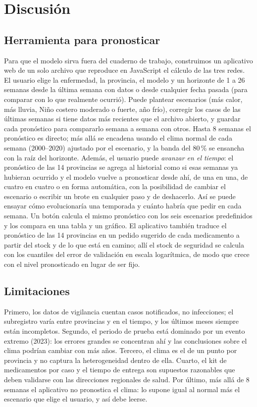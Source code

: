 \documentclass[conference,a4paper]{IEEEtran}
\begin{document}


\section{Discusión}
\subsection{Herramienta para pronosticar}
Para que el modelo sirva fuera del cuaderno de trabajo, construimos un aplicativo web de un solo archivo que reproduce en JavaScript el cálculo de las tres redes. El usuario elige la enfermedad, la provincia, el modelo y un horizonte de 1 a 26 semanas desde la última semana con datos o desde cualquier fecha pasada (para comparar con lo que realmente ocurrió). Puede plantear escenarios (más calor, más lluvia, Niño costero moderado o fuerte, año frío), corregir los casos de las últimas semanas si tiene datos más recientes que el archivo abierto, y guardar cada pronóstico para compararlo semana a semana con otros. Hasta 8 semanas el pronóstico es directo; más allá se encadena usando el clima normal de cada semana (2000--2020) ajustado por el escenario, y la banda del 80\,\% se ensancha con la raíz del horizonte. Además, el usuario puede \emph{avanzar en el tiempo}: el pronóstico de las 14 provincias se agrega al historial como si esas semanas ya hubieran ocurrido y el modelo vuelve a pronosticar desde ahí, de una en una, de cuatro en cuatro o en forma automática, con la posibilidad de cambiar el escenario o escribir un brote en cualquier paso y de deshacerlo. Así se puede ensayar cómo evolucionaría una temporada y cuánto habría que pedir en cada semana. Un botón calcula el mismo pronóstico con los seis escenarios predefinidos y los compara en una tabla y un gráfico. El aplicativo también traduce el pronóstico de las 14 provincias en un pedido sugerido de cada medicamento a partir del stock y de lo que está en camino; allí el stock de seguridad se calcula con los cuantiles del error de validación en escala logarítmica, de modo que crece con el nivel pronosticado en lugar de ser fijo.

\subsection{Limitaciones}
Primero, los datos de vigilancia cuentan casos notificados, no infecciones; el subregistro varía entre provincias y en el tiempo, y los últimos meses siempre están incompletos. Segundo, el periodo de prueba está dominado por un evento extremo (2023): los errores grandes se concentran ahí y las conclusiones sobre el clima podrían cambiar con más años. Tercero, el clima es el de un punto por provincia y no captura la heterogeneidad dentro de ella. Cuarto, el kit de medicamentos por caso y el tiempo de entrega son supuestos razonables que deben validarse con las direcciones regionales de salud. Por último, más allá de 8 semanas el aplicativo no pronostica el clima: lo supone igual al normal más el escenario que elige el usuario, y así debe leerse.
\end{document}
